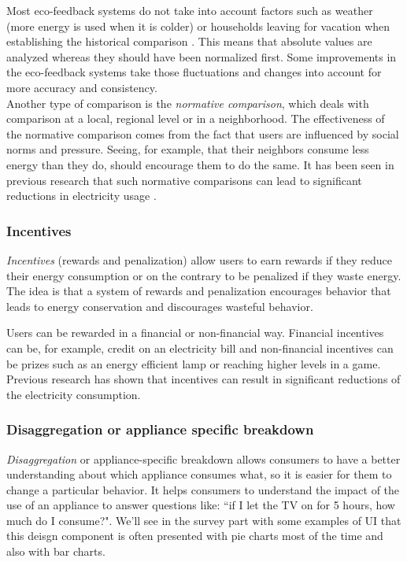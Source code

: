 \documentclass[journal]{vgtc}                %
\begin{document}
Most eco-feedback systems do not take into account factors such as weather (more energy is used when it is colder) or households leaving for vacation when establishing the historical comparison \cite{karjalainen2011consumer}. This means that absolute values are analyzed whereas they should have been normalized first. Some improvements in the eco-feedback systems take those fluctuations and changes into account for more accuracy and consistency. \\

Another type of comparison is the \textit{normative comparison}, which deals with comparison at a local, regional level or in a neighborhood. The effectiveness of the normative comparison comes from the fact that users are influenced by social norms and pressure. Seeing, for example, that their neighbors consume less energy than they do, should encourage them to do the same. It has been seen in previous research that such normative comparisons can lead to significant reductions in electricity usage \cite{peschiera2010response,siero1996changing,iyer2006comparison}.


\subsubsection{Incentives}
\textit{Incentives} (rewards and penalization) allow users to earn rewards if they reduce their energy consumption or on the contrary to be penalized if they waste energy. The idea is that a system of rewards and penalization encourages behavior that leads to energy conservation and discourages wasteful behavior.

Users can be rewarded in a financial or non-financial way. Financial incentives can be, for example, credit on an electricity bill and non-financial incentives can be prizes such as an energy efficient lamp or reaching higher levels in a game.
Previous research \cite{petersen2007dormitory} has shown that incentives can result in significant reductions of the electricity consumption.

\subsubsection{Disaggregation or appliance specific breakdown}
\textit{Disaggregation} or appliance-specific breakdown allows consumers to have a better understanding about which appliance consumes what, so it is easier for them to change a particular behavior. It helps consumers to understand the impact of the use of an appliance to answer questions like: ``if I let the TV on for 5 hours, how much do I consume?".
We'll see in the survey part with some examples of UI that this deisgn component is often presented with pie charts most of the time and also with bar charts.
\end{document}
